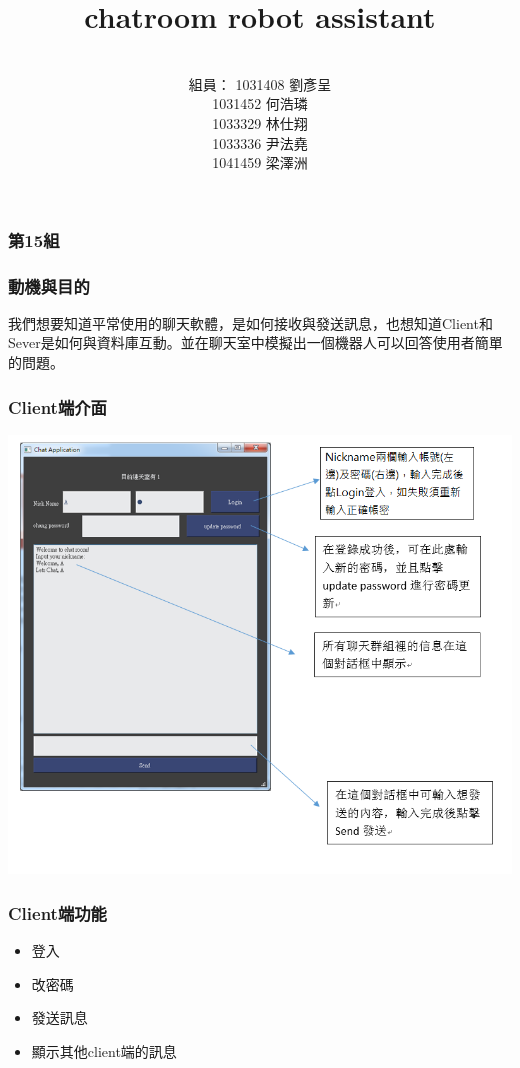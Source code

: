 \documentclass[utf8x]{beamer}
\title[Short title]{\Huge chatroom robot assistant} %
\author{\\  \hspace{-3em}組員： 1031408 劉彥呈 \\ 1031452 何浩璘 \\ 1033329 林仕翔 \\ 1033336 尹法堯 \\ 1041459 梁澤洲} %
\date{} %
\begin{document}
\begin{frame}
\frametitle{\huge 第15組} %
\titlepage %
\end{frame}
\begin{frame}[t]
\frametitle{\huge  動機與目的} %
\vspace{2em}
\hspace{1em} \Large 我們想要知道平常使用的聊天軟體，是如何接收與發送訊息，也想知道Client和Sever是如何與資料庫互動。並在聊天室中模擬出一個機器人可以回答使用者簡單的問題。
\end{frame}
\begin{frame}
\frametitle{\huge Client端介面} %
\hspace{2.9cm} \includegraphics[scale=0.4]{clientui}
\end{frame}

\begin{frame}[t]
\frametitle{\huge Client端功能} %
\begin{itemize}
\Large \item 登入
\item 改密碼
\item 發送訊息
\item 顯示其他client端的訊息
\end{itemize}
\end{frame}
\end{document}
